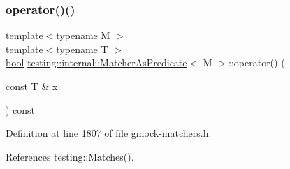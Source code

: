\mbox{\label{classtesting_1_1internal_1_1MatcherAsPredicate_ab4594a16ff5cdfd07acb5017b7aa54f3}} 
\subsubsection{\texorpdfstring{operator()()}{operator()()}}
{\footnotesize\ttfamily template$<$typename M $>$ \\
template$<$typename T $>$ \\
\hyperlink{classbool}{bool} \hyperlink{classtesting_1_1internal_1_1MatcherAsPredicate}{testing\+::internal\+::\+Matcher\+As\+Predicate}$<$ M $>$\+::operator() (\begin{DoxyParamCaption}\item[{const T \&}]{x }\end{DoxyParamCaption}) const\hspace{0.3cm}{\ttfamily [inline]}}



Definition at line 1807 of file gmock-\/matchers.\+h.



References testing\+::\+Matches().


